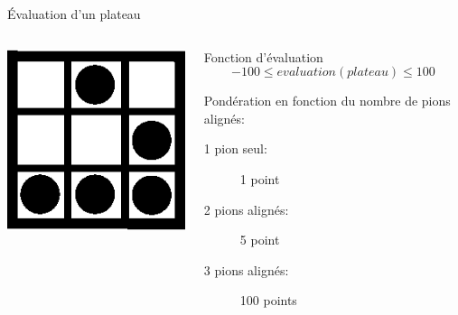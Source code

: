 \documentclass[compress, 12pt]{beamer}
\begin{document}
\begin{frame}{Évaluation d'un plateau}
    \begin{columns}
        \begin{column}{.2\textwidth}
            \includegraphics[width=\textwidth]{./pix/sym_plateau}
        \end{column}
        \begin{column}{.6\textwidth}
            \begin{block}{Fonction d'évaluation}
                $$-100 \leq evaluation(plateau) \leq 100$$
            \end{block}
            \begin{block}{Pondération en fonction du nombre de pions alignés:}
                \begin{description}
                    \item[1 pion seul:] 1 point 
                    \item[2 pions alignés:] 5 point
                    \item[3 pions alignés:] 100 points
                \end{description}
            \end{block}
        \end{column}
    \end{columns}
\end{frame}
\end{document}
